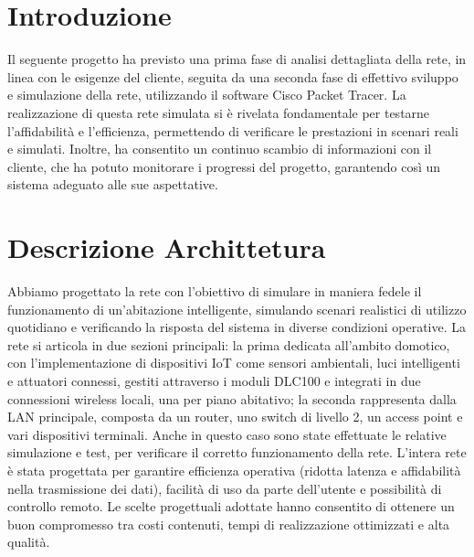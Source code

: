 \documentclass[italian, 12pt, a4paper]{article}
\begin{document}
\section{Introduzione}\label{sec:introduzione}
Il seguente progetto ha previsto una prima fase di analisi dettagliata della rete, in linea con le esigenze del cliente, seguita da una seconda fase di effettivo sviluppo e simulazione della rete, utilizzando il software Cisco Packet Tracer. La realizzazione di questa rete simulata si è rivelata fondamentale per testarne l'affidabilità e l'efficienza, permettendo di verificare le prestazioni in scenari reali e simulati. Inoltre, ha consentito un continuo scambio di informazioni con il cliente, che ha potuto monitorare i progressi del progetto, garantendo così un sistema adeguato alle sue aspettative.
\clearpage

\section{Descrizione Archittetura}\label{sec:descrizione}
Abbiamo progettato la rete con l’obiettivo di simulare in maniera fedele il funzionamento di un’abitazione intelligente, simulando scenari realistici di utilizzo quotidiano e verificando la risposta del sistema in diverse condizioni operative. La rete si articola in due sezioni principali: la prima dedicata all’ambito domotico, con l’implementazione di dispositivi IoT come sensori ambientali, luci intelligenti e attuatori connessi, gestiti attraverso i moduli DLC100 e integrati in due connessioni wireless locali, una per piano abitativo; la seconda rappresenta dalla LAN principale, composta da un router, uno switch di livello 2, un access point e vari dispositivi terminali. Anche in questo caso sono state effettuate le relative simulazione e test, per verificare il corretto funzionamento della rete. L’intera rete è stata progettata per garantire efficienza operativa (ridotta latenza e affidabilità nella trasmissione dei dati), facilità di uso da parte dell’utente e possibilità di controllo remoto. Le scelte progettuali adottate hanno consentito di ottenere un buon compromesso tra costi contenuti, tempi di realizzazione ottimizzati e alta qualità.
\end{document}
